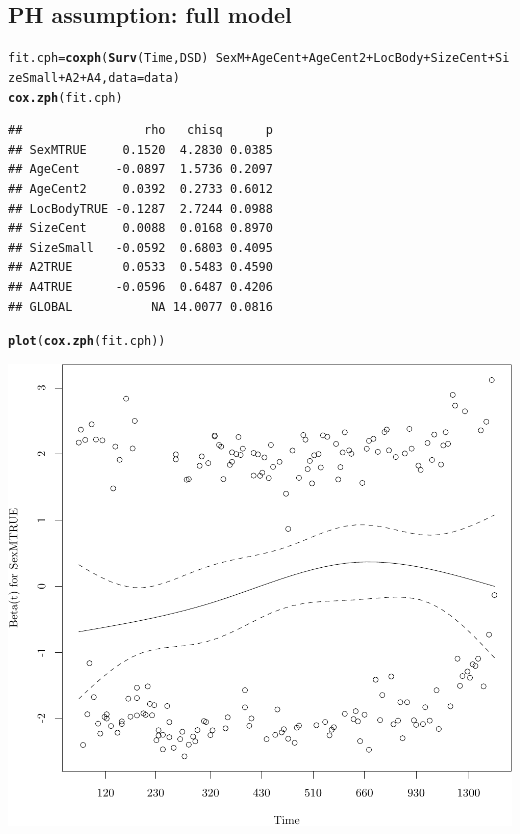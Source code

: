 \documentclass{article}\usepackage[]{graphicx}\usepackage[]{color}
\makeatletter
\def\maxwidth{ %
  \ifdim\Gin@nat@width>\linewidth
    \linewidth
  \else
    \Gin@nat@width
  \fi
}
\newcommand{\hlopt}[1]{\textcolor[rgb]{0,0,0}{#1}}%
\newcommand{\hlstd}[1]{\textcolor[rgb]{0.345,0.345,0.345}{#1}}%
\newcommand{\hlkwb}[1]{\textcolor[rgb]{0.69,0.353,0.396}{#1}}%
\newcommand{\hlkwc}[1]{\textcolor[rgb]{0.333,0.667,0.333}{#1}}%
\newcommand{\hlkwd}[1]{\textcolor[rgb]{0.737,0.353,0.396}{\textbf{#1}}}%
\newenvironment{kframe}{%
 \def\at@end@of@kframe{}%
 \ifinner\ifhmode%
  \def\at@end@of@kframe{\end{minipage}}%
  \begin{minipage}{\columnwidth}%
 \fi\fi%
 \def\FrameCommand##1{\hskip\@totalleftmargin \hskip-\fboxsep
 \colorbox{shadecolor}{##1}\hskip-\fboxsep
     \hskip-\linewidth \hskip-\@totalleftmargin \hskip\columnwidth}%
 \MakeFramed {\advance\hsize-\width
   \@totalleftmargin\z@ \linewidth\hsize
   \@setminipage}}%
 {\par\unskip\endMakeFramed%
 \at@end@of@kframe}
\newenvironment{knitrout}{}{} %
\makeatother
\begin{document}
\subsection{PH assumption: full model}
\begin{knitrout}
\color{fgcolor}\begin{kframe}
\begin{alltt}
\hlstd{fit.cph} \hlkwb{=} \hlkwd{coxph}\hlstd{(}\hlkwd{Surv}\hlstd{(Time, DSD)} \hlopt{~} \hlstd{SexM} \hlopt{+} \hlstd{AgeCent} \hlopt{+} \hlstd{AgeCent2} \hlopt{+} \hlstd{LocBody} \hlopt{+} \hlstd{SizeCent} \hlopt{+} \hlstd{SizeSmall} \hlopt{+} \hlstd{A2} \hlopt{+} \hlstd{A4,} \hlkwc{data} \hlstd{= data)}
\hlkwd{cox.zph}\hlstd{(fit.cph)}
\end{alltt}
\begin{verbatim}
##                 rho   chisq      p
## SexMTRUE     0.1520  4.2830 0.0385
## AgeCent     -0.0897  1.5736 0.2097
## AgeCent2     0.0392  0.2733 0.6012
## LocBodyTRUE -0.1287  2.7244 0.0988
## SizeCent     0.0088  0.0168 0.8970
## SizeSmall   -0.0592  0.6803 0.4095
## A2TRUE       0.0533  0.5483 0.4590
## A4TRUE      -0.0596  0.6487 0.4206
## GLOBAL           NA 14.0077 0.0816
\end{verbatim}
\begin{alltt}
\hlkwd{plot}\hlstd{(}\hlkwd{cox.zph}\hlstd{(fit.cph))}
\end{alltt}
\end{kframe}

{\centering \includegraphics[width=\maxwidth]{figure/05-eda-ph-check-full-1} 

}
\end{knitrout}
\end{document}
